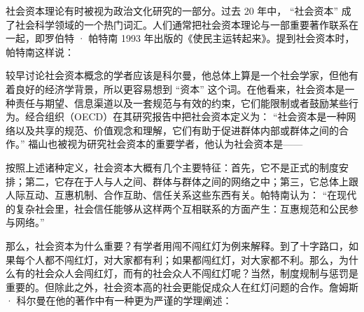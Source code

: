 
社会资本理论有时被视为政治文化研究的一部分。过去 20 年中， “社会资本” 成了社会科学领域的一个热门词汇。人们通常把社会资本理论与一部重要著作联系在一起，即罗伯特 · 帕特南 1993 年出版的《使民主运转起来》。提到社会资本时，帕特南这样说：


较早讨论社会资本概念的学者应该是科尔曼，他总体上算是一个社会学家，但他有着良好的经济学背景，所以更容易想到 “资本” 这个词。在他看来，社会资本是一种责任与期望、信息渠道以及一套规范与有效的约束，它们能限制或者鼓励某些行为。经合组织（OECD）在其研究报告中把社会资本定义为： “社会资本是一种网络以及共享的规范、价值观念和理解，它们有助于促进群体内部或群体之间的合作。” 福山也被视为研究社会资本的重要学者，他认为社会资本是——


按照上述诸种定义，社会资本大概有几个主要特征：首先，它不是正式的制度安排；第二，它存在于人与人之间、群体与群体之间的网络之中；第三，它总体上跟人际互动、互惠机制、合作互助、信任关系这些东西有关。帕特南认为： “在现代的复杂社会里，社会信任能够从这样两个互相联系的方面产生：互惠规范和公民参与网络。” 

那么，社会资本为什么重要？有学者用闯不闯红灯为例来解释。到了十字路口，如果每个人都不闯红灯，对大家都有利；如果都闯红灯，对大家都不利。那么，为什么有的社会众人会闯红灯，而有的社会众人不闯红灯呢？当然，制度规制与惩罚是重要的。但除此之外，社会资本高的社会更能促成众人在红灯问题的合作。詹姆斯 · 科尔曼在他的著作中有一种更为严谨的学理阐述：


